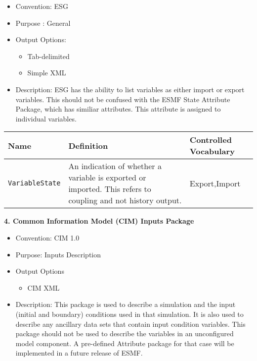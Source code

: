 \begin{itemize}
    \item Convention: ESG
    \item Purpose : General
    \item Output Options: 
    \begin{itemize}
        \item Tab-delimited
        \item Simple XML
    \end{itemize}
    \item Description: ESG has the ability to list variables as either import or export variables. This should not be confused with the ESMF State Attribute Package, which has similiar attributes. This attribute is assigned to individual variables.  
\end{itemize}

\begin{tabular}{|p{8cm}|p{20cm}|p{10cm}|}
     {\bf Name } & {\bf Definition} & {\bf Controlled Vocabulary} \\
     \hline\hline
     {\tt VariableState} & An indication of whether a variable is exported or imported. This refers to coupling and not history output. & Export,Import\\
\end{tabular}




\vspace{.25in}
{\bf 4. Common Information Model (CIM) Inputs Package}
\label{CIMFieldAttributePackages}

\begin{itemize}
    \item Convention: CIM 1.0
    \item Purpose: Inputs Description
    \item Output Options
    \begin{itemize}
        \item CIM XML 
    \end{itemize}
    \item Description: This package is used to describe a simulation and the input (initial and boundary) conditions used in that simulation. It is also used to describe any ancillary data sets that contain input condition variables. This package should not be used to describe the variables in an unconfigured model component. A pre-defined Attribute package for that case will be implemented in a future release of ESMF.    
\end{itemize}

